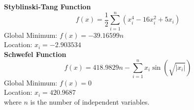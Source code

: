 \documentclass[paper,revised]{geophysics}
\begin{document}
{\bf{Styblinski-Tang Function}}
\begin{equation}
	f(x) = \frac{1}{2} \sum_{i=1}^{n} \left( x_i^4 - 16x_i^2 + 5x_i \right)
\end{equation}
Global Minimum: \(f(x) = -39.16599n\)\\
Location: \(x_i = -2.903534\)\\

{\bf{Schwefel Function}}
\begin{equation}
	f(x) = 418.9829n - \sum_{i=1}^{n} x_i \sin(\sqrt{|x_i|})
\end{equation}
Global Minimum: \(f(x) = 0\)\\
Location: \(x_i = 420.9687\)\\
where \(n\) is the number of independent variables.
%


%


%

\newpage


\end{document}
